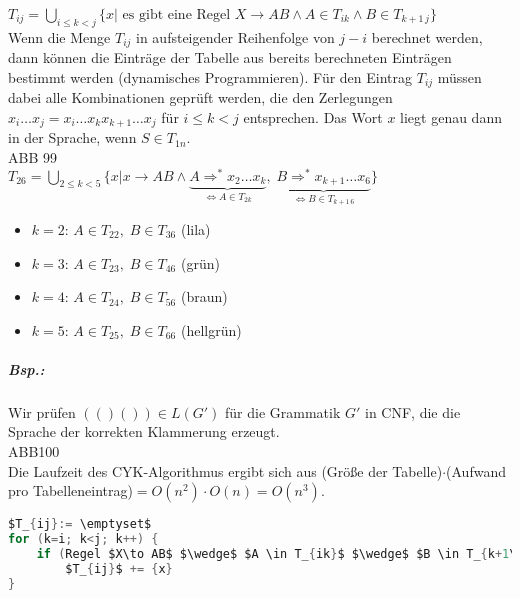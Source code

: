 $T_{ij}=\bigcup_{i\leq k<j} \{x | \text{ es gibt eine Regel }X\to AB \wedge A \in T_{ik} \wedge B\in T_{k+1\, j}\}$\\
Wenn die Menge $T_{ij}$ in aufsteigender Reihenfolge von $j-i$ berechnet werden, dann können die Einträge der Tabelle aus bereits berechneten Einträgen bestimmt werden (dynamisches Programmieren). Für den Eintrag $T_{ij}$ müssen dabei alle Kombinationen geprüft werden, die den Zerlegungen $x_i \dots x_j=x_i\dots x_k x_{k+1} \dots x_j$ für $i\leq k < j$ entsprechen. Das Wort $x$ liegt genau dann in der Sprache, wenn $S \in T_{1n}$.\\
ABB 99\\
$T_{26}=\bigcup_{2\leq k<5}\{x| x\to AB \wedge \underbrace{A \Rightarrow^* x_2\dots x_k}_{\Leftrightarrow A \in T_{2k}}, \; \underbrace{B\Rightarrow^* x_{k+1}\dots x_6}_{\Leftrightarrow B \in T_{k+1\, 6}}\}$
\begin{itemize}
\item $k=2$: $A\in T_{22},\; B \in T_{36}$ (lila)
\item $k=3$: $A \in T_{23}, \; B \in T_{46}$ (grün)
\item $k=4$: $A\in T_{24}, \; B \in T_{56}$ (braun)
\item $k=5$: $A \in T_{25}, \; B \in T_{66}$ (hellgrün)
\end{itemize}
\subparagraph{Bsp.:} Wir prüfen $(()()) \in L(G')$ für die Grammatik $G'$ in CNF, die die Sprache der korrekten Klammerung erzeugt.\\
ABB100 \\
Die Laufzeit des CYK-Algorithmus ergibt sich aus (Größe der Tabelle)$\cdot$(Aufwand pro Tabelleneintrag)$=O(n^2) \cdot O(n)=O(n^3)$.
\begin{lstlisting}[language=C]
$T_{ij}:= \emptyset$
for (k=i; k<j; k++) {
	if (Regel $X\to AB$ $\wedge$ $A \in T_{ik}$ $\wedge$ $B \in T_{k+1\,j}$)
		$T_{ij}$ += {x}
}
\end{lstlisting}

\newpage
\printbibliography

